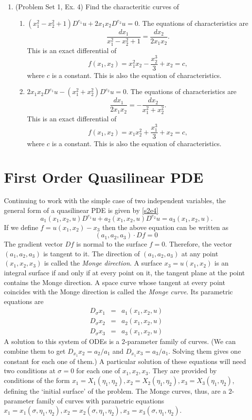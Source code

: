 \documentclass{article}
\theoremstyle{plain}
\numberwithin{thm}{section}
\theoremstyle{plain}
\numberwithin{prop}{section}
\theoremstyle{definition}
\numberwithin{defn}{section}
\theoremstyle{remark}
\numberwithin{equation}{section}
\begin{document}
\begin{enumerate}
\item (Problem Set 1, Ex. 4) Find the characteritic curves of
\begin{enumerate}
\item $(x_1^2 - x_2^2 + 1)D^{e_1}u + 2x_1x_2D^{e_2}u = 0$. The equations of characteristics are
\[
\frac{dx_1}{x_1^2 - x_2^2 + 1} = \frac{dx_2}{2x_1x_2}.
\]
This is an exact differential of
\[
f(x_1, x_2) = x_1^2x_2 - \frac{x_2^3}{3} + x_2 = c,
\]
where $c$ is a constant. This is also the equation of characteristics.
\item $2x_1x_2D^{e_1}u - (x_1^2 + x_2^2)D^{e_2}u = 0$. The equations of characteristics are
\[
\frac{dx_1}{2x_1x_2} = -\frac{dx_2}{x_1^2 + x_2^2}.
\]
This is an exact differential of
\[
f(x_1, x_2) = x_1x_2^2 + \frac{x_1^3}{3} + x_2 = c,
\]
where $c$ is a constant. This is also the equation of characteristics.
\end{enumerate}
\end{enumerate}

\section{First Order Quasilinear PDE}\label{s4}
Continuing to work with the simple case of two independent variables, the general form of a 
quasilinear PDE is given by \eqref{s2e4}
\[
a_1(x_1, x_2, u)D^{e_1}u + a_2(x_1, x_2, u)D^{e_2}u = a_3(x_1, x_2, u).
\]
If we define $f = u(x_1, x_2) - x_3$ then the above equation can be written as
\begin{equation}\label{s4e1}
(a_1, a_2, a_3)\cdot Df = 0
\end{equation}
The gradient vector $Df$ is normal to the surface $f = 0$. Therefore, the vector $(a_1, a_2, a_3)$ is
tangent to it. The direction of $(a_1, a_2, a_3)$ at any point $(x_1, x_2, x_3)$ is called the 
\emph{Monge direction}. A surface $x_3 = u(x_1, x_2)$ is an integral surface if and only if at every
point on it, the tangent plane at the point contains the Monge direction. A space curve whose tangent
at every point coincides with the Monge direction is called the \emph{Monge curve}. Its parametric
equations are
\begin{eqnarray}
D_\sigma x_1 &=& a_1(x_1, x_2, u) \label{s4e2} \\
D_\sigma x_2 &=& a_2(x_1, x_2, u) \label{s4e3} \\
D_\sigma x_3 &=& a_3(x_1, x_2, u) \label{s4e4}
\end{eqnarray}
A solution to this system of ODEs is a $2$-parameter family of curves. (We can combine them to get
$D_{x_1}x_2 = a_2/a_1$ and $D_{x_1}x_3 = a_3/a_1$. Solving them gives one constant for each one of
them.) A particular solution of these equations will need two conditions at $\sigma = 0$ for each
one of $x_1, x_2, x_3$. They are provided by conditions of the form $x_1 = X_1(\eta_1, \eta_2), 
x_2 = X_2(\eta_1, \eta_2), x_3 = X_3(\eta_1, \eta_2)$, defining the `initial surface' of the problem.
The Monge curves, thus, are a $2$-parameter family of curves with parametric equations $x_1 = x_1(
\sigma, \eta_1, \eta_2), x_2 = x_2(\sigma, \eta_1, \eta_2), x_3 = x_3(\sigma, \eta_1, \eta_2)$.
\end{document}
